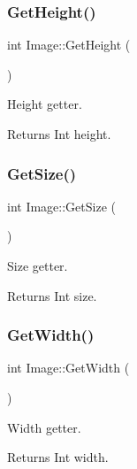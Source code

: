 \subsubsection{\texorpdfstring{Get\+Height()}{GetHeight()}}
{\footnotesize\ttfamily int Image\+::\+Get\+Height (\begin{DoxyParamCaption}{ }\end{DoxyParamCaption})}



Height getter. 

\begin{DoxyReturn}{Returns}
Int height. 
\end{DoxyReturn}
\mbox{\label{classImage_ad9ce272b2befc075fa720ac25f673202}} 
\subsubsection{\texorpdfstring{Get\+Size()}{GetSize()}}
{\footnotesize\ttfamily int Image\+::\+Get\+Size (\begin{DoxyParamCaption}{ }\end{DoxyParamCaption})}



Size getter. 

\begin{DoxyReturn}{Returns}
Int size. 
\end{DoxyReturn}
\mbox{\label{classImage_a4ab80d76fd124fd9de9b4fca8ae16186}} 
\subsubsection{\texorpdfstring{Get\+Width()}{GetWidth()}}
{\footnotesize\ttfamily int Image\+::\+Get\+Width (\begin{DoxyParamCaption}{ }\end{DoxyParamCaption})}



Width getter. 

\begin{DoxyReturn}{Returns}
Int width. 
\end{DoxyReturn}
\mbox{\label{classImage_a5fab96b8b5e873488b72185639790c92}} 
